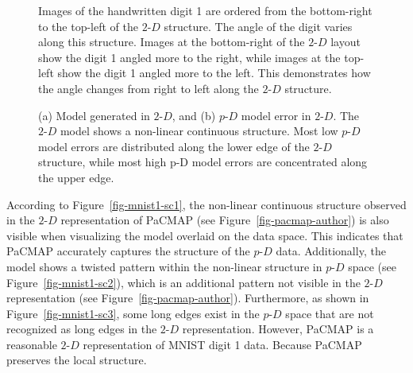 \documentclass[
  12pt]{article}
\newcommand\pD{$p\text{-}D$}
\newcommand\gD{$2\text{-}D$}
\begin{document}
\begin{figure}[H]


\caption{\label{fig-pacmap-author-img}Images of the handwritten digit 1
are ordered from the bottom-right to the top-left of the \(2\text{-}D\)
structure. The angle of the digit varies along this structure. Images at
the bottom-right of the \(2\text{-}D\) layout show the digit 1 angled
more to the right, while images at the top-left show the digit 1 angled
more to the left. This demonstrates how the angle changes from right to
left along the \(2\text{-}D\) structure.}

\end{figure}%

\begin{figure}[H]


\caption{\label{fig-model-mnist}(a) Model generated in \(2\text{-}D\),
and (b) \(p\text{-}D\) model error in \(2\text{-}D\). The \(2\text{-}D\)
model shows a non-linear continuous structure. Most low \(p\text{-}D\)
model errors are distributed along the lower edge of the \(2\text{-}D\)
structure, while most high p-D model errors are concentrated along the
upper edge.}

\end{figure}%

According to Figure~\ref{fig-mnist1-sc1}, the non-linear continuous
structure observed in the \gD{} representation of PaCMAP (see
Figure~\ref{fig-pacmap-author}) is also visible when visualizing the
model overlaid on the data space. This indicates that PaCMAP accurately
captures the structure of the \pD{} data. Additionally, the model shows
a twisted pattern within the non-linear structure in \pD{} space (see
Figure~\ref{fig-mnist1-sc2}), which is an additional pattern not visible
in the \gD{} representation (see Figure~\ref{fig-pacmap-author}).
Furthermore, as shown in Figure~\ref{fig-mnist1-sc3}, some long edges
exist in the \pD{} space that are not recognized as long edges in the
\gD{} representation. However, PaCMAP is a reasonable \gD{}
representation of MNIST digit 1 data. Because PaCMAP preserves the local
structure.
\end{document}
